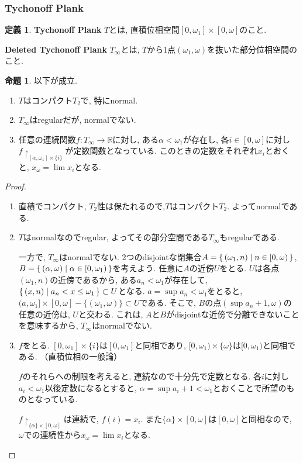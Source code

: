 \documentclass[a4paper, twoside]{bxjsarticle}
\newcommand{\rea}{\mathbb{R}}
\theoremstyle{definition}
\newtheorem{prop}[thm]{命題}
\newtheorem{defn}[thm]{定義}
\begin{document}
    \subsubsection{Tychonoff Plank}
        \begin{defn}
            \textbf{Tychonoff Plank} $T$とは, 直積位相空間$[0, \omega_1]\times[0, \omega]$のこと.
            
            \textbf{Deleted Tychonoff Plank} $T_\infty$とは, $T$から1点$(\omega_1, \omega)$を抜いた部分位相空間のこと.
        \end{defn}
        \begin{prop}
            以下が成立. 
            \begin{enumerate}
                \item $T$はコンパクト$T_2$で, 特にnormal. 
                \item $T_\infty$はregularだが, normalでない.
                \item 任意の連続関数$f\colon T_\infty\to\rea$に対し, ある$\alpha<\omega_1$が存在し, 各$i \in[0, \omega]$に対し$f\restriction_{[\alpha, \omega_1]\times\{i\}}$が定数関数となっている. このときの定数をそれぞれ$x_i$とおくと, $x_\omega = \lim x_i$となる.
            \end{enumerate}
        \end{prop}
        \begin{proof}
            \begin{enumerate}
                \item 直積でコンパクト, $T_2$性は保たれるので,$T$はコンパクト$T_2$. よってnormalである.
                \item $T$はnormalなのでregular, よってその部分空間である$T_\infty$もregularである. 
                
                一方で, $T_\infty$はnormalでない. 2つのdisjointな閉集合$A=\set{(\omega_1, n)|n\in[0, \omega)}$, $B=\set{(\alpha, \omega)|\alpha\in[0, \omega_1)}$を考えよう. 任意に$A$の近傍$U$をとる. $U$は各点$(\omega_1, n)$の近傍であるから, ある$a_n<\omega_1$が存在して, $\set{(x, n)|a_n<x\leq\omega_1}\subset U$となる. $a=\sup a_n<\omega_1$をとると, $(a, \omega_1]\times[0, \omega]-\{(\omega_1, \omega)\}\subset U$である. そこで, $B$の点$(\sup a_n+1, \omega)$の任意の近傍は, $U$と交わる. これは, $A$と$B$がdisjointな近傍で分離できないことを意味するから, $T_\infty$はnormalでない.
                
                \item $f$をとる. $[0, \omega_1]\times\{i\}$は$[0, \omega_1]$と同相であり, $[0, \omega_1)\times\{\omega\}$は$[0, \omega_1)$と同相である. （直積位相の一般論）
                
                $f$のそれらへの制限を考えると, 連続なので十分先で定数となる. 各$i$に対し$a_i<\omega_1$以後定数になるとすると, $\alpha=\sup a_i+1<\omega_1$とおくことで所望のものとなっている.
                
                $f\restriction_{\{\alpha\}\times[0, \omega]}$は連続で, $f(i)=x_i$. また$\{\alpha\}\times[0, \omega]$は$[0, \omega]$と同相なので, $\omega$での連続性から$x_\omega=\lim x_i$となる.
            \end{enumerate}
        \end{proof}
\end{document}
